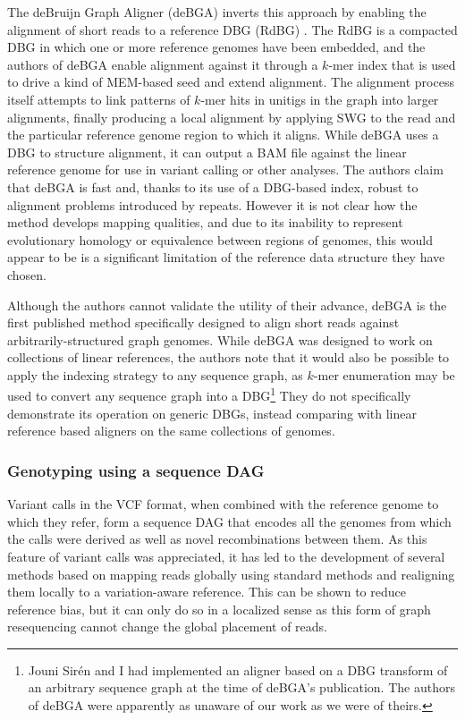 The deBruijn Graph Aligner (deBGA) inverts this approach by enabling the alignment of short reads to a reference DBG (RdBG) \cite{liu2016debga}.
The RdBG is a compacted DBG in which one or more reference genomes have been embedded, and the authors of deBGA enable alignment against it through a $k$-mer index that is used to drive a kind of MEM-based seed and extend alignment.
The alignment process itself attempts to link patterns of $k$-mer hits in unitigs in the graph into larger alignments, finally producing a local alignment by applying SWG to the read and the particular reference genome region to which it aligns.
While deBGA uses a DBG to structure alignment, it can output a BAM file against the linear reference genome for use in variant calling or other analyses.
The authors claim that deBGA is fast and, thanks to its use of a DBG-based index, robust to alignment problems introduced by repeats.
However it is not clear how the method develops mapping qualities, and due to its inability to represent evolutionary homology or equivalence between regions of genomes, this would appear to be is a significant limitation of the reference data structure they have chosen.

Although the authors cannot validate the utility of their advance, deBGA is the first published method specifically designed to align short reads against arbitrarily-structured graph genomes.
While deBGA was designed to work on collections of linear references, the authors note that it would also be possible to apply the indexing strategy to any sequence graph, as $k$-mer enumeration may be used to convert any sequence graph into a DBG\footnote{Jouni Sir\'{e}n and I had implemented an aligner based on a DBG transform of an arbitrary sequence graph at the time of deBGA's publication. The authors of deBGA were apparently as unaware of our work as we were of theirs.}
They do not specifically demonstrate its operation on generic DBGs, instead comparing with linear reference based aligners on the same collections of genomes.

\subsubsection{Genotyping using a sequence DAG}
\label{sec:seq_dag_vcf}
Variant calls in the VCF format, when combined with the reference genome to which they refer, form a sequence DAG that encodes all the genomes from which the calls were derived as well as novel recombinations between them.
As this feature of variant calls was appreciated, it has led to the development of several methods based on mapping reads globally using standard methods and realigning them locally to a variation-aware reference.
This can be shown to reduce reference bias, but it can only do so in a localized sense as this form of graph resequencing cannot change the global placement of reads.

